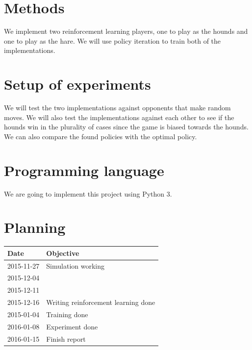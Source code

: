 \documentclass[a4paper]{article}
\begin{document}
\section{Methods}
We implement two reinforcement learning players, one to play as the hounds
and one to play as the hare. We will use policy iteration to train both of the
implementations.

\section{Setup of experiments}
We will test the two implementations against opponents that make random moves.
We will also test the implementations against each other to see if the hounds
win in the plurality of cases since the game is biased towards the hounds. We
can also compare the found policies with the optimal policy.

\section{Programming language}
We are going to implement this project using Python 3.

\section{Planning}
\begin{center}
	\begin{tabular}{l|l}
		Date       & Objective                           \\ \hline
		2015-11-27 & Simulation working                  \\
		2015-12-04 &  \\
		2015-12-11 &  \\
		2015-12-16 & Writing reinforcement learning done \\
		2015-01-04 & Training done                       \\
		2016-01-08 & Experiment done                     \\
		2016-01-15 & Finish report
	\end{tabular}
\end{center}
\end{document}
